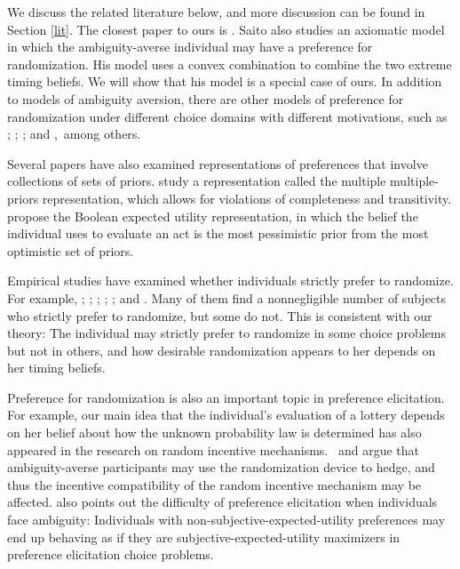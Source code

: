 \documentclass[12pt, notitlepage]{article}
\begin{document}
We discuss the related literature below, and more discussion can be found in
Section \ref{lit}. The closest paper to ours is \cite{Saito15}. Saito also
studies an axiomatic model in which the ambiguity-averse individual may have
a preference for randomization. His model uses a convex combination to
combine the two extreme timing beliefs. We will show that his model is a
special case of ours. In addition to models of ambiguity aversion, there are
other models of preference for randomization under different choice domains
with different motivations, such as \cite{Machina85}; \cite%
{Cerreia-VioglioDillenbergerOrtoleva15}; \cite{FudenbergIijimaStrzalecki15};
and \cite{Cerreia-VioglioDillenbergerOrtolevaEtAl19},\ among others.

Several papers have also examined representations of preferences that
involve collections of sets of priors. \cite{LehrerTeper11} study a
representation called the multiple multiple-priors representation, which
allows for violations of completeness and transitivity. \cite%
{FrickIijimaLeYaouanq19} propose the Boolean expected utility
representation, in which the belief the individual uses to evaluate an act
is the most pessimistic prior from the most optimistic set of priors.

Empirical studies have examined whether individuals strictly prefer to
randomize. For example, \cite{DominiakSchnedler11}; \cite{AgranovOrtoleva17}%
; \cite{DwengerKublerWeizsacker16}; \cite{OechsslerRauRoomets19}; \cite%
{ChewMiaoShenEtAl19}; and \cite{ZhangZhong19}. Many of them find a
nonnegligible number of subjects who strictly prefer to randomize, but some
do not. This is consistent with our theory: The individual may strictly
prefer to randomize in some choice problems but not in others, and how
desirable randomization appears to her depends on her timing beliefs.

Preference for randomization is also an important topic in preference
elicitation. For example, our main idea that the individual's evaluation of
a lottery depends on her belief about how the unknown probability law is
determined has also appeared in the research on random incentive mechanisms. 
\cite{Bade15}\ and \cite{BaillonHalevyLi15} argue that ambiguity-averse
participants may use the randomization device to hedge, and thus the
incentive compatibility of the random incentive mechanism may be affected. 
\cite{Kuzmics17} also points out the difficulty of preference elicitation
when individuals face ambiguity: Individuals with non-subjective-expected-utility preferences may
end up behaving as if they are subjective-expected-utility maximizers in preference elicitation
choice problems.
\end{document}
